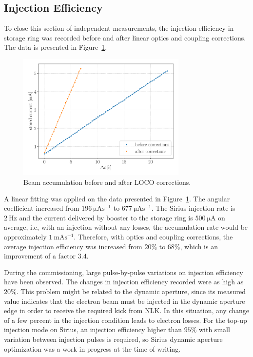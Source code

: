 \subsection{Injection Efficiency}
To close this section of independent measurements, the injection efficiency in storage ring was recorded before and after linear optics and coupling corrections. The data is presented in Figure~\ref{fig:injeff}.
\begin{figure}
\centering
\includegraphics[width=0.75\textwidth]{figures/injeff_grid.pdf}
\caption{Beam accumulation before and after LOCO corrections.}
\label{fig:injeff}
\end{figure}

A linear fitting was applied on the data presented in Figure~\ref{fig:injeff}. The angular coefficient increased from $\SI{196}{\micro\ampere\second^{-1}}$ to $\SI{677}{\micro\ampere\second^{-1}}$. The Sirius injection rate is $\SI{2}{\hertz}$ and the current delivered by booster to the storage ring is $\SI{500}{\micro\ampere}$ on average, i.e, with an injection without any losses, the accumulation rate would be approximately $\SI{1}{\milli\ampere\second^{-1}}$. Therefore, with optics and coupling corrections, the average injection efficiency was increased from $20\%$ to $68\%$, which is an improvement of a factor $3.4$.

During the commissioning, large pulse-by-pulse variations on injection efficiency have been observed. The changes in injection efficiency recorded were as high as $20\%$. This problem might be related to the dynamic aperture, since its measured value indicates that the electron beam must be injected in the dynamic aperture edge in order to receive the required kick from NLK. In this situation, any change of a few percent in the injection condition leads to electron losses. For the top-up injection mode on Sirius, an injection efficiency higher than $95\%$ with small variation between injection pulses is required, so Sirius dynamic aperture optimization was a work in progress at the time of writing. 

